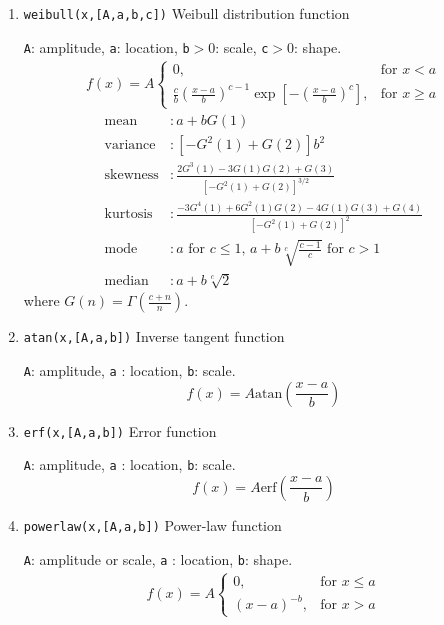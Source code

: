\documentclass[reprint,showpacs,prb,nofootinbib,amsmath,amssymb]{revtex4-1}
\begin{document}
\begin{enumerate}
\item \verb|weibull(x,[A,a,b,c])| Weibull distribution function~\cite{weibull,McLaughlin}

\verb|A|: amplitude, \verb|a|: location, \verb|b|$>0$: scale, \verb|c|$>0$: shape.
\begin{eqnarray}
f(x)=A
\begin{cases}
0, &\text{for }x< a \\
\frac{c}{b}\left(\frac{x-a}{b}\right)^{c-1}\exp\left[-\left(\frac{x-a}{b}\right)^c\right], &\text{for }x\geq a  \nonumber
\end{cases}
\end{eqnarray}
\begin{align}
	\mbox{mean} 		&: \mbox{$a+bG(1)$} \nonumber \\
	\mbox{variance}		&: \mbox{$\left[-G^2(1)+G(2)\right]b^2$} \nonumber \\
	\mbox{skewness} 	&: \mbox{$\frac{2G^3(1)-3G(1)G(2)+G(3)}{\left[-G^2(1)+G(2)\right]^{3/2}}$} \nonumber \\	
	\mbox{kurtosis} 	&: \mbox{$\frac{-3G^4(1)+6G^2(1)G(2)-4G(1)G(3)+G(4)}{\left[-G^2(1)+G(2)\right]^2}$} \nonumber \\	
	\mbox{mode}         &: \mbox{$a$ for $c\leq 1$, $a+b\sqrt[c]{\frac{c-1}{c}}$ for $c>1$}  \nonumber \\
	\mbox{median} 		&: \mbox{$a+b\sqrt[c]{2}$}  \nonumber 
\end{align}
where $G(n)=\Gamma\left(\frac{c+n}{n}\right)$.

\item \verb|atan(x,[A,a,b])| Inverse tangent function

\verb|A|: amplitude, \verb|a| : location, \verb|b|: scale.
\begin{equation}
f(x)=A\mathrm{atan}\left(\frac{x-a}{b}\right)\nonumber
\end{equation}

\item \verb|erf(x,[A,a,b])| Error function

\verb|A|: amplitude, \verb|a| : location, \verb|b|: scale.
\begin{equation}
f(x)=A\mathrm{erf}\left(\frac{x-a}{b}\right)\nonumber
\end{equation}

\item \verb|powerlaw(x,[A,a,b])| Power-law function

\verb|A|: amplitude or scale, \verb|a| : location, \verb|b|: shape.
\begin{eqnarray}
f(x)=A
\begin{cases}
0, &\text{for }x\leq a \\
(x-a)^{-b}, &\text{for }x> a  \nonumber
\end{cases}
\end{eqnarray}

\end{enumerate}


\end{document}
